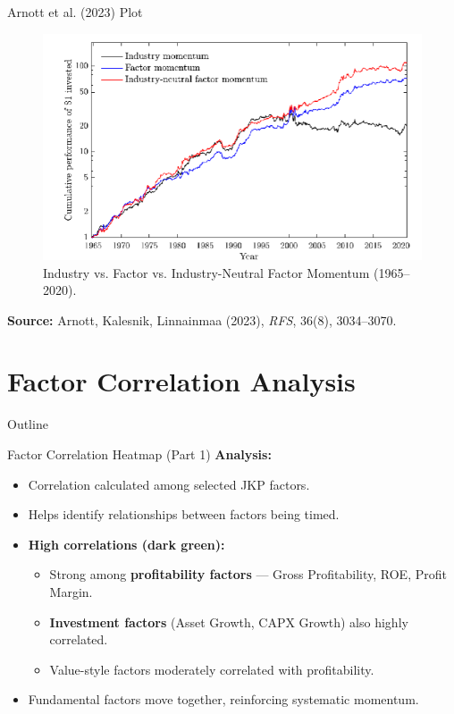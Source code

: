\documentclass[t]{beamer}
\begin{document}
\begin{frame}{Arnott et al. (2023) Plot}
\begin{figure}[ht]
    \centering
    \includegraphics[width=0.92\linewidth]{Actual_plot.png}
    \caption{Industry vs. Factor vs. Industry-Neutral Factor Momentum (1965–2020).}
\end{figure}
\footnotesize
\textbf{Source:} Arnott, Kalesnik, Linnainmaa (2023), \textit{RFS}, 36(8), 3034–3070.
\end{frame}

\section{Factor Correlation Analysis}

\begin{frame}{Outline}
\end{frame}

\begin{frame}{Factor Correlation Heatmap (Part 1)}
\textbf{Analysis:}
\begin{itemize}
    \item Correlation calculated among selected JKP factors.
    \item Helps identify relationships between factors being timed.
    \item \textbf{High correlations (dark green):}
    \begin{itemize}
        \item Strong among \textbf{profitability factors} — Gross Profitability, ROE, Profit Margin.
        \item \textbf{Investment factors} (Asset Growth, CAPX Growth) also highly correlated.
        \item Value-style factors moderately correlated with profitability.
    \end{itemize}
    \item Fundamental factors move together, reinforcing systematic momentum.
\end{itemize}
\end{frame}
\end{document}
